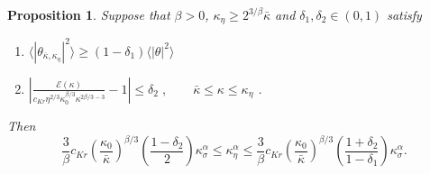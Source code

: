 \documentclass[twoside, reqno]{amsart}
\numberwithin{lemma}{section}
\numberwithin{theorem}{section}
\newtheorem{proposition}{Proposition}
\numberwithin{proposition}{section}
\numberwithin{equation}{section} %
\newcommand{\te}{\theta}
\newcommand{\ka}{\kappa}
\newcommand{\kbar}{\overline{\ka}}
\newcommand{\al}{\alpha}
\newcommand{\de}{\delta}
\begin{document}
\begin{proposition}\label{main:prop2}
Suppose that $\beta>0$, $\ka_\eta \ge 2^{3/\beta}\bar{\ka}$ and ${\delta_1, \de_2} \in (0,1)$ satisfy
    \begin{enumerate}[label=(\roman*)]
        \item $\langle|\te_{\kbar,\ka_\eta}|^2\rangle \ge (1-\delta_1)\langle|\te|^2\rangle$
        \item $\left|\frac{\mathcal{E}(\ka)}{c_{Kr} \eta^{2/3} \ka_0^{\beta/3} \ka^{2\beta/3-3}} - 1\right| \le \delta_2\;,  \qquad
\bar{\ka} \le \ka \le \ka_\eta$ \;.
    \end{enumerate}
Then
    \begin{equation} \label{rel:ksigmaeta}
        \frac{3}{\beta} c_{Kr} \left( \frac{\ka_0}{\bar{\ka}}\right)^{\beta/3} {\left(\frac{1 - \delta_2}{2}\right)} \ka_\sigma^{\al} \le \ka_\eta^{\al} \le \frac{3}{\beta} c_{Kr} \left( \frac{\ka_0}{\bar{\ka}}\right)^{\beta/3} \left(\frac{1+\delta_2}{1-\delta_1}\right) \ka_\sigma^{\al}.
    \end{equation}
\end{proposition}
\end{document}
